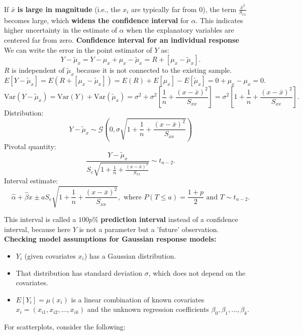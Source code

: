 \documentclass[a4paper,12pt]{article}
\begin{document}
If \(\bar{x}\) \textbf{is large in magnitude} (i.e., the \(x_i\) are typically far from 0), the term \(\frac{\bar{x}^2}{S_{xx}}\) becomes large, which\textbf{ widens the confidence interval} for \(\alpha\). This indicates higher uncertainty in the estimate of \(\alpha\) when the explanatory variables are centered far from zero.
\newpage
\textbf{Confidence interval for an individual response}
\\We can write the error in the point estimator of \(Y\) as:\[
Y - \tilde{\mu}_x = Y - \mu_x + \mu_x - \tilde{\mu}_x = R + [\mu_x - \tilde{\mu}_x].
\] \(R\) is independent of \(\tilde{\mu}_x\) because it is not connected to the existing sample.
\[
E[Y - \tilde{\mu}_x] = E(R + [\mu_x - \tilde{\mu}_x]) = E(R) + E[\mu_x] - E[\tilde{\mu}_x] = 0 + \mu_x - \mu_x = 0.
\]
\[
\text{Var}(Y - \tilde{\mu}_x) = \text{Var}(Y) + \text{Var}(\tilde{\mu}_x) = \sigma^2 + \sigma^2 \left[ \frac{1}{n} + \frac{(x - \bar{x})^2}{S_{xx}} \right] = \sigma^2 \left[ 1 + \frac{1}{n} + \frac{(x - \bar{x})^2}{S_{xx}} \right].
\]
Distribution:\[
Y - \tilde{\mu}_x \sim \mathcal{G}\left(0, \sigma \sqrt{1 + \frac{1}{n} + \frac{(x - \bar{x})^2}{S_{xx}}}\right)
\]
Pivotal quantity:\[
\frac{Y - \tilde{\mu}_x}{S_e \sqrt{1 + \frac{1}{n} + \frac{(x - \bar{x})^2}{S_{xx}}}} \sim t_{n-2}.
\]
Interval estimate: \[
\hat{\alpha} + \hat{\beta}x \pm a S_e \sqrt{1 + \frac{1}{n} + \frac{(x - \bar{x})^2}{S_{xx}}},
\text{ where } P(T \leq a) = \frac{1 + p}{2} \text{ and } T \sim t_{n-2}.\]

This interval is called a \(100p\%\) \textbf{prediction interval} instead of a confidence interval, because here \(Y\) is not a parameter but a 'future' observation.
\bigskip
\\\textbf{Checking model assumptions for
Gaussian response models:}
\begin{itemize}
    \item \(Y_i\) (given covariates \(x_i\)) has a Gaussian distribution.
    \item That distribution has standard deviation \(\sigma\), which does not depend on the covariates.
    \item \(E[Y_i] = \mu(x_i)\) is a linear combination of known covariates \(x_i = (x_{i1}, x_{i2}, \dots, x_{ik})\) and the unknown regression coefficients \(\beta_0, \beta_1, \dots, \beta_k\).
\end{itemize}
For scatterplots, consider the following:
\end{document}
